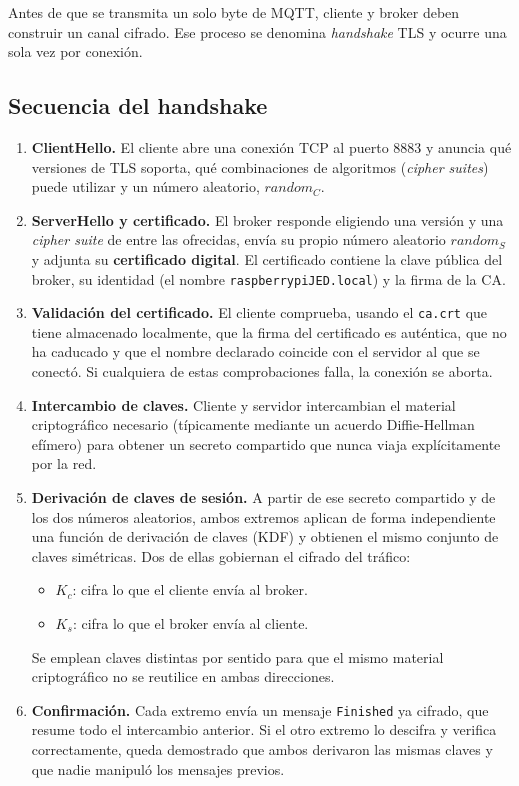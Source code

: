 \documentclass[12pt,a4paper]{article}
\newcommand{\Kc}{K_{c}}
\newcommand{\Ks}{K_{s}}
\begin{document}
Antes de que se transmita un solo byte de MQTT, cliente y broker deben construir un canal cifrado. Ese proceso se denomina \textit{handshake} TLS y ocurre una sola vez por conexión.

\subsection{Secuencia del handshake}

\begin{enumerate}[leftmargin=1.4cm, itemsep=0.35em]
	\item \textbf{ClientHello.} El cliente abre una conexión TCP al puerto 8883 y anuncia qué versiones de TLS soporta, qué combinaciones de algoritmos (\textit{cipher suites}) puede utilizar y un número aleatorio, $random_C$.

	\item \textbf{ServerHello y certificado.} El broker responde eligiendo una versión y una \textit{cipher suite} de entre las ofrecidas, envía su propio número aleatorio $random_S$ y adjunta su \textbf{certificado digital}. El certificado contiene la clave pública del broker, su identidad (el nombre \texttt{raspberrypiJED.local}) y la firma de la CA.

	\item \textbf{Validación del certificado.} El cliente comprueba, usando el \texttt{ca.crt} que tiene almacenado localmente, que la firma del certificado es auténtica, que no ha caducado y que el nombre declarado coincide con el servidor al que se conectó. Si cualquiera de estas comprobaciones falla, la conexión se aborta.

	\item \textbf{Intercambio de claves.} Cliente y servidor intercambian el material criptográfico necesario (típicamente mediante un acuerdo Diffie-Hellman efímero) para obtener un secreto compartido que nunca viaja explícitamente por la red.

	\item \textbf{Derivación de claves de sesión.} A partir de ese secreto compartido y de los dos números aleatorios, ambos extremos aplican de forma independiente una función de derivación de claves (KDF) y obtienen el mismo conjunto de claves simétricas. Dos de ellas gobiernan el cifrado del tráfico:
	\begin{itemize}
		\item $\Kc$: cifra lo que el cliente envía al broker.
		\item $\Ks$: cifra lo que el broker envía al cliente.
	\end{itemize}
	Se emplean claves distintas por sentido para que el mismo material criptográfico no se reutilice en ambas direcciones.

	\item \textbf{Confirmación.} Cada extremo envía un mensaje \texttt{Finished} ya cifrado, que resume todo el intercambio anterior. Si el otro extremo lo descifra y verifica correctamente, queda demostrado que ambos derivaron las mismas claves y que nadie manipuló los mensajes previos.
\end{enumerate}
\end{document}
